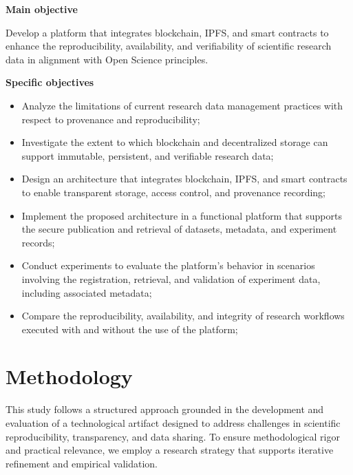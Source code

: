 \documentclass[final]{rc-book-2.14}
\begin{document}
\textbf{Main objective}

\begin{citeverbatim}

Develop a platform that integrates blockchain, IPFS, and smart contracts to enhance the reproducibility, availability, and verifiability of scientific research data in alignment with Open Science principles.

\end{citeverbatim}

\textbf{Specific objectives}
\begin{itemize}
    \item Analyze the limitations of current research data management practices with respect to provenance and reproducibility;
    
    \item Investigate the extent to which blockchain and decentralized storage can support immutable, persistent, and verifiable research data;

    \item Design an architecture that integrates blockchain, IPFS, and smart contracts to enable transparent storage, access control, and provenance recording;

    \item Implement the proposed architecture in a functional platform that supports the secure publication and retrieval of datasets, metadata, and experiment records;

    \item Conduct experiments to evaluate the platform’s behavior in scenarios involving the registration, retrieval, and validation of experiment data, including associated metadata;

    \item Compare the reproducibility, availability, and integrity of research workflows executed with and without the use of the platform;

\end{itemize}

\section{Methodology}
\label{chp:intro:sec:methodology}

This study follows a structured approach grounded in the development and evaluation of a technological artifact designed to address challenges in scientific reproducibility, transparency, and data sharing. To ensure methodological rigor and practical relevance, we employ a research strategy that supports iterative refinement and empirical validation.
\end{document}
